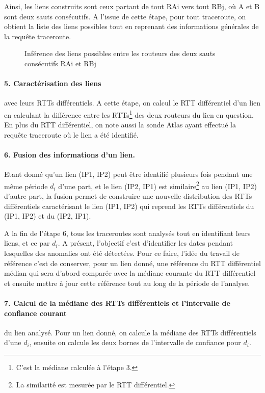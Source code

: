 Ainsi, les liens  construits sont ceux partant de tout RAi vers tout RBj, où A et B sont deux sauts consécutifs. A l'issue de cette étape, pour tout traceroute, on obtient la liste des liens possibles tout en reprenant des informations générales de la requête traceroute.
\begin{figure}[H]
	\centering
	\captionsetup{justification=centering}
	
	\caption{Inférence des liens possibles entre les routeurs des deux sauts consécutifs RAi et RBj}
	\label{fig:link-inference}
\end{figure}
\paragraph{5. Caractérisation des liens} avec leurs RTTs différentiels. A cette étape, on calcul le RTT différentiel d'un lien en calculant la différence entre les RTTs\footnote{C'est la médiane calculée à l'étape 3.} des deux routeurs du lien en question. En plus du RTT différentiel, on note aussi la sonde Atlas ayant effectué la requête traceroute où le lien a été identifié. 

\paragraph{6. Fusion des informations d'un lien. } Etant donné qu'un lien (IP1, IP2) peut être identifié plusieurs fois pendant une même période $d_i$ d'une part, et le lien (IP2, IP1) est similaire\footnote{La similarité est mesurée par le RTT différentiel.} au lien  (IP1, IP2) d'autre part, la fusion permet de construire une nouvelle distribution des RTTs différentiels caractérisant le lien (IP1, IP2) qui reprend les RTTs différentiels du (IP1, IP2) et du (IP2, IP1).


A la fin de l'étape 6, tous les traceroutes sont analysés tout en identifiant leurs liens, et ce par $d_i$. A présent, l'objectif c'est d'identifier les dates pendant lesquelles des anomalies ont été détectées. Pour ce faire, l'idée du travail de référence c'est de conserver, pour un lien donné, une référence du RTT différentiel médian qui sera d'abord comparée avec la médiane courante du RTT différentiel et ensuite mettre à jour cette référence tout au long de la période de l'analyse.

  
  \paragraph{7. Calcul de la médiane des RTTs différentiels et   l'intervalle de confiance courant} du lien analysé. Pour un lien donné, on calcule la médiane des RTTs différentiels d'une $d_i$, ensuite on calcule les deux bornes de l'intervalle de confiance pour $d_i$.
  
